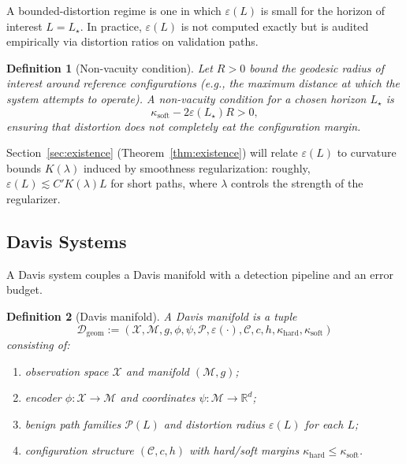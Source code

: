 \documentclass[11pt]{article}
\newtheorem{definition}{Definition}
\begin{document}
A bounded-distortion regime is one in which $\varepsilon(L)$ is small for the horizon
of interest $L=L_\star$. In practice, $\varepsilon(L)$ is not computed exactly but is
audited empirically via distortion ratios on validation paths.

\begin{definition}[Non-vacuity condition]
Let $R>0$ bound the geodesic radius of interest around reference configurations
(e.g., the maximum distance at which the system attempts to operate). A non-vacuity
condition for a chosen horizon $L_\star$ is
\[
    \kappa_{\mathrm{soft}} - 2 \varepsilon(L_\star) R > 0,
\]
ensuring that distortion does not completely eat the configuration margin.
\end{definition}

Section~\ref{sec:existence} (Theorem~\ref{thm:existence}) will relate $\varepsilon(L)$
to curvature bounds $K(\lambda)$ induced by smoothness regularization: roughly,
$\varepsilon(L) \lesssim C' K(\lambda) L$ for short paths, where $\lambda$ controls
the strength of the regularizer.

\subsection{Davis Systems}
\label{subsec:davis-system-def}

A Davis system couples a Davis manifold with a detection pipeline and an error budget.

\begin{definition}[Davis manifold]\label{def:davis-manifold}
A \emph{Davis manifold} is a tuple
\[
    \mathcal{D}_{\text{geom}}
    :=
    (\mathcal{X},\mathcal{M},g,\phi,\psi,\mathcal{P},\varepsilon(\cdot),
      \mathcal{C},c,h,\kappa_{\mathrm{hard}},\kappa_{\mathrm{soft}})
\]
consisting of:
\begin{enumerate}[label=(\roman*),leftmargin=*]
    \item observation space $\mathcal{X}$ and manifold $(\mathcal{M},g)$;
    \item encoder $\phi:\mathcal{X}\to\mathcal{M}$ and coordinates $\psi:\mathcal{M}\to\mathbb{R}^d$;
    \item benign path families $\mathcal{P}(L)$ and distortion radius $\varepsilon(L)$ for each $L$;
    \item configuration structure $(\mathcal{C},c,h)$ with hard/soft margins
    $\kappa_{\mathrm{hard}}\le\kappa_{\mathrm{soft}}$.
\end{enumerate}
\end{definition}
\end{document}
